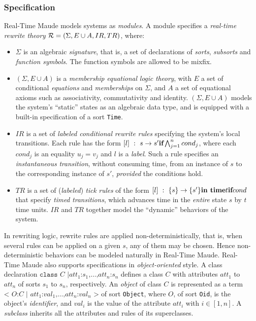 \documentclass[10pt,journal]{IEEEtran}
\begin{document}
\subsubsection{Specification}
Real-Time Maude models systems as \emph{modules}. A module specifies a
\emph{real-time rewrite theory} ${\cal R} = (\Sigma, E\cup A , IR,
TR)$, where:
\begin{itemize}
\item $\Sigma$ is an algebraic \emph{signature}, that is, a set of
  declarations of \emph{sorts}, \emph{subsorts} and \emph{function
    symbols}. The function symbols are allowed to be mixfix.
\item $(\Sigma, E\cup A)$ is a \emph{membership equational logic
  theory}, with $E$ a set of conditional \emph{equations} and
  \emph{memberships} on $\Sigma$, and $A$ a set of equational axioms
  such as associativity, commutativity and identity.  $(\Sigma, E\cup
  A)$ models the system's ``static'' states as an algebraic data type,
  and is equipped with a built-in specification of a sort \verb|Time|.
\item $IR$ is a set of \emph{labeled conditional rewrite rules}
  specifying the system's local transitions. Each rule has the form
  $[l]~:~s\rightarrow s'\mbox{ \textbf{if} }\bigwedge^n_{j=1}cond_j$,
  where each $cond_j$ is an equality $u_j=v_j$ and $l$ is a
  \emph{label}. Such a rule specifies an \emph{instantaneous
    transition}, without consuming time, from an instance of $s$ to
  the corresponding instance of $s'$, \emph{provided} the conditions
  hold.
\item $TR$ is a set of (\emph{labeled}) \emph{tick rules} of the form
  $[l]~:~\{s\}\rightarrow\{s'\} \mbox{ \textbf{in time} }t\mbox{
  \textbf{if} }cond$ that specify \emph{timed transitions}, which
  advances time in the \emph{entire} state $s$ by $t$ time units. $IR$
  and $TR$ together model the ``dynamic'' behaviors of the system.
\end{itemize}

In rewriting logic, rewrite rules are applied non-deterministically,
that is, when several rules can be applied on a given $s$, any of them
may be chosen. Hence non-deterministic behaviors can be modeled
naturally in Real-Time Maude.  Real-Time Maude also supports
specifications in \emph{object-oriented} style.  A class declaration
$\texttt{class }C\texttt{ |
}att_1\texttt{:}s_1\texttt{,}\ldots\texttt{,}att_n\texttt{:}s_n$
defines a class $C$ with attributes $att_1$ to $att_n$ of sorts $s_1$
to $s_n$, respectively. An \emph{object} of class $C$ is represented
as a term $\texttt{< } O\texttt{:} C \texttt{ | }
att_1\texttt{:}val_1\texttt{,} \ldots
\texttt{,}att_n\texttt{:}val_n\texttt{ >}$ of sort \verb|Object|,
where $O$, of sort \verb|Oid|, is the object's \emph{identifier}, and
$val_i$ is the value of the attribute $att_i$ with $i\in [1,n]$. A
\emph{subclass} inherits all the attributes and rules of its
superclasses.
\end{document}
